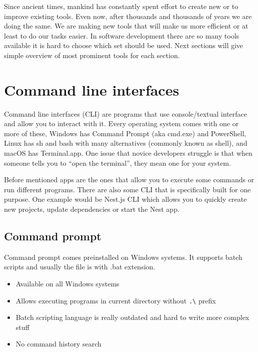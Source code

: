 Since ancient times, mankind has constantly spent effort to create new or to improve existing tools.
Even now, after thousands and thousands of years we are doing the same.
We are making new tools that will make us more efficient or at least to do our tasks easier.
In software development there are so many tools available it is hard to choose which set should be used.
Next sections will give simple overview of most prominent tools for each section.


\section{Command line interfaces}\label{sec:command-line-interfaces}
Command line interfaces (CLI) are programs that use console/textual interface and allow you to interact with it.
Every operating system comes with one or more of these, Windows has Command Prompt (aka cmd.exe) and PowerShell,
Linux has sh and bash with many alternatives (commonly known as shell), and macOS has Terminal.app.
One issue that novice developers struggle is that when someone tells you to “open the terminal”,
they mean one for your system.

Before mentioned apps are the ones that allow you to execute some commands or run different programs.
There are also some CLI that is specifically built for one purpose.
One example would be Nest.js CLI which allows you to quickly create new projects,
update dependencies or start the Nest app.

\subsection{Command prompt}\label{subsec:command-prompt}
Command prompt comes preinstalled on Windows systems.
It supports batch scripts and usually the file is with .bat extension.

\noindent\begin{minipage}[t]{0.5\textwidth}%
    \begin{itemize}[leftmargin=*]
        \item Available on all Windows systems
        \item Allows executing programs in current directory without  \lstinline{.\}  prefix
    \end{itemize}
\end{minipage}%
\begin{minipage}[t]{0.5\textwidth}%
    \begin{itemize}[leftmargin=*]
        \item Batch scripting language is really outdated and hard to write more complex stuff
        \item No command history search
    \end{itemize}
\end{minipage}%

